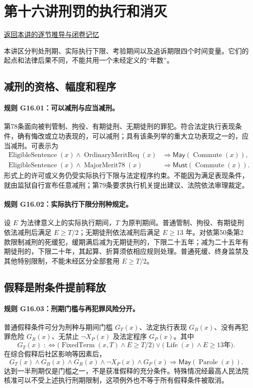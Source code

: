 \section{第十六讲\quad 刑罚的执行和消灭}

\label{ref:lecture:16}

\noindent\hyperref[lecture:16]{返回本讲的逐节推导与闭卷记忆}

本讲区分判处刑期、实际执行下限、考验期间以及追诉期限四个时间变量。它们的起点和法律后果不同，不能共用一个未经定义的“年数”。

\subsection{减刑的资格、幅度和程序}
\paragraph{规则 G16.01：可以减刑与应当减刑。}
第78条面向被判管制、拘役、有期徒刑、无期徒刑的罪犯。符合法定执行表现条件，确有悔改或立功表现的，可以减刑；具有该条列举的重大立功表现之一的，应当减刑。可表示为
\[
\begin{aligned}
\operatorname{EligibleSentence}(x)\land\operatorname{OrdinaryMeritReq}(x)
&\Longrightarrow\mathsf{May}(\operatorname{Commute}(x)),\\
\operatorname{EligibleSentence}(x)\land\operatorname{MajorMerit78}(x)
&\Longrightarrow\mathsf{Must}(\operatorname{Commute}(x)).
\end{aligned}
\]
形式上的许可或义务仍受实际执行下限与法定程序约束。不能因为满足表现条件，就由监狱自行宣布任意减刑；第79条要求执行机关提出建议、法院依法审理裁定。

\paragraph{规则 G16.02：实际执行下限分刑种规定。}
设 $E$ 为法律意义上的实际执行期间，$T$ 为原判期间。普通管制、拘役、有期徒刑依法减刑后满足 $E\ge T/2$；无期徒刑依法减刑后满足 $E\ge13$ 年。对依第50条第2款限制减刑的死缓犯，缓期满后减为无期徒刑的，下限二十五年；减为二十五年有期徒刑的，下限二十年，其起算、折算须依相应规则处理。普通死缓、终身监禁及其他特别限制，不能未经区分全部套用 $E\ge T/2$。

\subsection{假释是附条件提前释放}
\paragraph{规则 G16.03：刑期门槛与再犯罪风险分开。}
普通假释条件可分为刑种与期间门槛 $G_T(x)$、法定执行表现 $G_B(x)$、没有再犯罪危险 $G_R(x)$、无禁止 $\neg X_P(x)$ 及法定程序 $G_P(x)$。其中
\[
G_T(x)\;:\!\!\iff
\bigl(\operatorname{FixedTerm}(x,T)\land E\ge T/2\bigr)
\lor\bigl(\operatorname{Life}(x)\land E\ge13\text{年}\bigr).
\]
在综合假释后社区影响等因素后，
\[
G_T(x)\land G_B(x)\land G_R(x)\land\neg X_P(x)\land G_P(x)
\Longrightarrow\mathsf{May}(\operatorname{Parole}(x)).
\]
达到一半刑期仅是门槛之一，不是获准假释的充分条件。特殊情况经最高人民法院核准可以不受上述执行刑期限制，这项例外也不等于所有假释条件被取消。

